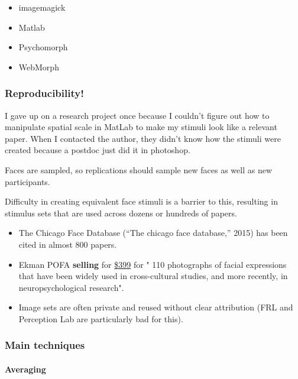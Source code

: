 \documentclass[
  english,
  man]{apa6}
\providecommand{\tightlist}{%
  \setlength{\itemsep}{0pt}\setlength{\parskip}{0pt}}
\let\oldparagraph\paragraph
\renewcommand{\paragraph}[1]{\oldparagraph{#1}\mbox{}}
\begin{document}
\begin{itemize}
\tightlist
\item
  imagemagick
\item
  Matlab
\item
  Psychomorph
\item
  WebMorph
\end{itemize}

\hypertarget{reproducibility}{%
\subsubsection{Reproducibility!}\label{reproducibility}}

I gave up on a research project once because I couldn't figure out how to manipulate spatial scale in MatLab to make my stimuli look like a relevant paper. When I contacted the author, they didn't know how the stimuli were created because a postdoc just did it in photoshop.

Faces are sampled, so replications should sample new faces as well as new participants.

Difficulty in creating equivalent face stimuli is a barrier to this, resulting in stimulus sets that are used across dozens or hundreds of papers.

\begin{itemize}
\tightlist
\item
  The Chicago Face Database ({``The chicago face database,''} 2015) has been cited in almost 800 papers.
\item
  Ekman POFA \textbf{selling} for \href{https://www.paulekman.com/product/pictures-of-facial-affect-pofa/}{\$399} for " 110 photographs of facial expressions that have been widely used in cross-cultural studies, and more recently, in neuropsychological research".
\item
  Image sets are often private and reused without clear attribution (FRL and Perception Lab are particularly bad for this).
\end{itemize}

\hypertarget{main-techniques}{%
\subsubsection{Main techniques}\label{main-techniques}}

\hypertarget{averaging}{%
\paragraph{Averaging}\label{averaging}}
\end{document}
